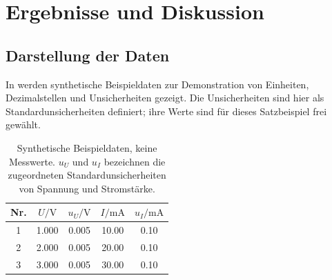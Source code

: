 \chapter{Ergebnisse und Diskussion}
\label{chap:results}

\section{Darstellung der Daten}
In  werden synthetische Beispieldaten zur Demonstration
von Einheiten, Dezimalstellen und Unsicherheiten gezeigt. Die Unsicherheiten
sind hier als Standardunsicherheiten definiert; ihre Werte sind für dieses
Satzbeispiel frei gewählt.
\begin{table}[htbp]
  \centering
  \caption[Synthetische Beispieldaten]{Synthetische Beispieldaten, keine
    Messwerte. $u_U$ und $u_I$ bezeichnen die zugeordneten
    Standardunsicherheiten von Spannung und Stromstärke.}
  \label{tab:example}
  \begin{tabular}{c S[table-format=1.3] S[table-format=1.3]
                    S[table-format=2.2] S[table-format=1.2]}
    \toprule
    Nr. & {$U/\unit{\volt}$} & {$u_U/\unit{\volt}$}
        & {$I/\unit{\milli\ampere}$} & {$u_I/\unit{\milli\ampere}$} \\
     & 1.000 & 0.005 & 10.00 & 0.10 \\
    2 & 2.000 & 0.005 & 20.00 & 0.10 \\
    3 & 3.000 & 0.005 & 30.00 & 0.10 \\
    \bottomrule
  \end{tabular}
\end{table}

